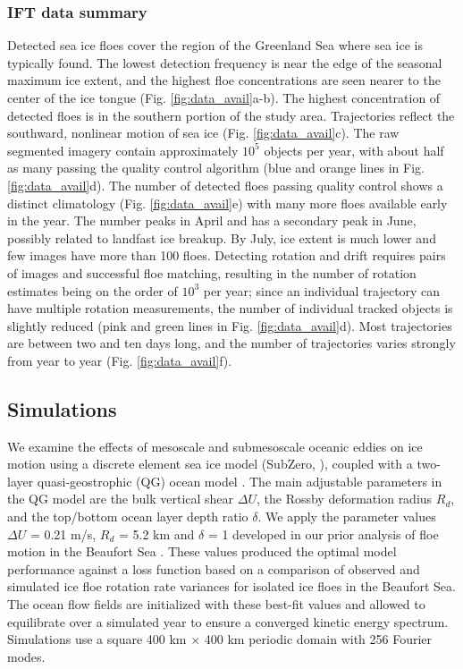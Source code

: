 \documentclass[aog]{igs}
\begin{document}
\subsubsection{IFT data summary}
Detected sea ice floes cover the region of the Greenland Sea where sea ice is typically found. The lowest detection frequency is near the edge of the seasonal maximum ice extent, and the highest floe concentrations are seen nearer to the center of the ice tongue (Fig. \ref{fig:data_avail}a-b). The highest concentration of detected floes is in the southern portion of the study area. Trajectories reflect the southward, nonlinear motion of sea ice (Fig. \ref{fig:data_avail}c).
The raw segmented imagery contain approximately $10^5$ objects per year, with about half as many passing the quality control algorithm (blue and orange lines in Fig. \ref{fig:data_avail}d).
The number of detected floes passing quality control shows a distinct climatology (Fig. \ref{fig:data_avail}e) with many more floes available early in the year. The number peaks in April and has a secondary peak in June, possibly related to landfast ice breakup. By July, ice extent is much lower and few images have more than 100 floes.
Detecting rotation and drift requires pairs of images and successful floe matching, resulting in the number of rotation estimates being on the order of $10^3$ per year; since an individual trajectory can have multiple rotation measurements, the number of individual tracked objects is slightly reduced (pink and green lines in Fig. \ref{fig:data_avail}d). Most trajectories are between two and ten days long, and the number of trajectories varies strongly from year to year (Fig. \ref{fig:data_avail}f).

\subsection{Simulations}
We examine the effects of mesoscale and submesoscale oceanic eddies on ice motion using a discrete element sea ice model (SubZero, \cite{manucharyan2022_SubZeroSea}), coupled with a two-layer quasi-geostrophic (QG) ocean model \citep{arbic2012_NonlinearCascades}. 
The main adjustable parameters in the QG model are the bulk vertical shear $\Delta U$, the Rossby deformation radius $R_d$, and the top/bottom ocean layer depth ratio $\delta$. 
We apply the parameter values $\Delta U$ = 0.21 m/s, $R_d$ = 5.2 km and  $\delta$ = 1 developed in our prior analysis of floe motion in the Beaufort Sea \citep{manucharyan2022_SpinningIce}. These values produced the optimal model performance against a loss function based on a comparison of observed and simulated ice floe rotation rate variances for isolated ice floes in the Beaufort Sea.
The ocean flow fields are initialized with these best-fit values and allowed to equilibrate over a simulated year to ensure a converged kinetic energy spectrum. Simulations use a square 400 km $\times$ 400 km periodic domain with 256 Fourier modes.
\end{document}
